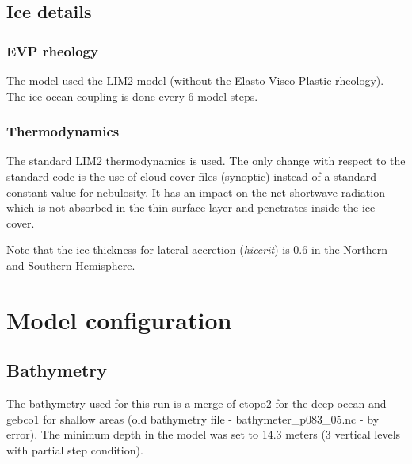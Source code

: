 \documentclass[12pt]{article}
\begin{document}

\subsection{Ice details}

\subsubsection{EVP rheology}

The model used the LIM2 model (without the Elasto-Visco-Plastic rheology). The ice-ocean coupling is done every 6 model steps.

\subsubsection{Thermodynamics}

The standard LIM2 thermodynamics is used. The only change with respect to the standard code is the use of cloud cover files (synoptic) instead 
of a standard constant value for nebulosity. It has an impact on the net shortwave radiation which is not absorbed in the thin surface 
layer and penetrates inside the ice cover.

Note that the ice thickness for lateral accretion (\textit{hiccrit}) is 0.6 in the Northern and Southern Hemisphere.

\scriptsize




\normalsize


\section{Model configuration}

\subsection{Bathymetry}

The bathymetry used for this run is a merge of etopo2 for the deep ocean and gebco1 for shallow areas (old bathymetry file - bathymeter\_p083\_05.nc - by error). 
The minimum depth in the model was set to 14.3 meters (3 vertical levels with partial step condition).
\end{document}
